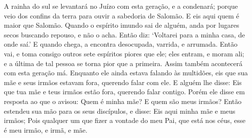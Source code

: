{  A rainha do sul se levantará no Juízo com esta geração, e a condenará; porque veio dos confins da terra para ouvir a sabedoria de Salomão. E eis aqui quem é maior que Salomão.
  Quando o espírito imundo sai de alguém, anda por lugares secos buscando repouso, e não o acha.
  Então diz: ‘Voltarei para a minha casa, de onde saí.’ E quando chega, a encontra desocupada, varrida, e arrumada.
  Então vai, e toma consigo outros sete espíritos piores que ele; eles entram, e moram ali; e a última
{} de tal pessoa se torna pior que a primeira. Assim também acontecerá com esta geração má.
  Enquanto ele ainda estava falando às multidões, eis que sua mãe e seus irmãos estavam fora, querendo falar com ele.
  E alguém lhe disse: Eis que tua mãe e teus irmãos estão fora, querendo falar contigo.
  Porém ele disse em resposta ao que o avisou: Quem é minha mãe? E quem são meus irmãos?
  Então estendeu sua mão para os seus discípulos, e disse: Eis aqui minha mãe e meus irmãos;
  Pois qualquer um que fizer a vontade do meu Pai, que está nos céus, esse é meu irmão, e irmã, e mãe.
\par }

